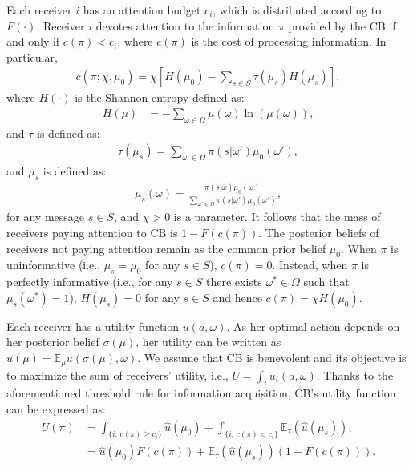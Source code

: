 \documentclass[12pt,a4paper]{article}
\begin{document}
Each receiver $i$ has an attention budget $c_i$, which is distributed according to $F(\cdot)$. Receiver $i$ devotes attention to the information $\pi$ provided by the CB if and only if $c(\pi)<c_i$, where $c(\pi)$ is the cost of processing information. In particular,
\begin{align}
\label{cost}
    c(\pi; \chi, \mu_0) = \chi\left[H(\mu_0)-\sum_{s \in S}\tau(\mu_s) H(\mu_s)\right],
\end{align}
where $H(\cdot)$ is the Shannon entropy defined as:
\begin{align}
    H(\mu) & = -\sum_{\omega\in\Omega}\mu(\omega)\ln(\mu(\omega)),
\end{align}
and $\tau$ is defined as:
\begin{align}
\label{tau}
    \tau(\mu_s) = \sum_{\omega'\in\Omega}\pi(s|\omega')\mu_0(\omega'),
\end{align}
and $\mu_s$ is defined as:
\begin{align}
    \mu_s(\omega) = \frac{\pi(s|\omega)\mu_0(\omega)}{\sum_{\omega'\in\Omega}\pi(s|\omega')\mu_0(\omega')},
\end{align}
for any message $s\in S$, and $\chi>0$ is a parameter. It follows that the mass of receivers paying attention to CB is $1-F(c(\pi))$. The posterior beliefs of receivers not paying attention remain as the common prior belief $\mu_0$. When $\pi$ is uninformative (i.e., $\mu_s = \mu_0$ for any $s\in S$), $c(\pi)=0$. Instead, when $\pi$ is perfectly informative (i.e., for any $s \in S$ there exists $\omega^* \in \Omega$ such that $\mu_s(\omega^*)=1$), $H(\mu_s)=0$ for any $s\in S$ and hence $c(\pi)=\chi H(\mu_0)$.

Each receiver has a utility function $u(a,\omega)$. As her optimal action depends on her posterior belief $\sigma(\mu)$, her utility can be written as $\hat{u}(\mu)=\mathbb{E}_\mu u(\sigma(\mu),\omega)$. We assume that CB is benevolent and its objective is to maximize the sum of receivers' utility, i.e., $U = \int_i u_i(a,\omega)$. Thanks to the aforementioned threshold rule for information acquisition, CB's utility function can be expressed as:
\begin{align}
   U(\pi) & = \int_{\{i:\, c(\pi) \geq c_i\}} \hat{u}(\mu_0) + \int_{\{i:\, c(\pi) < c_i\}} \mathbb{E}_\tau(\hat{u}(\mu_s)), \\
   & = \hat{u}(\mu_0)F(c(\pi)) + \mathbb{E}_\tau(\hat{u}(\mu_s))(1-F(c(\pi))).
\end{align}
\end{document}
